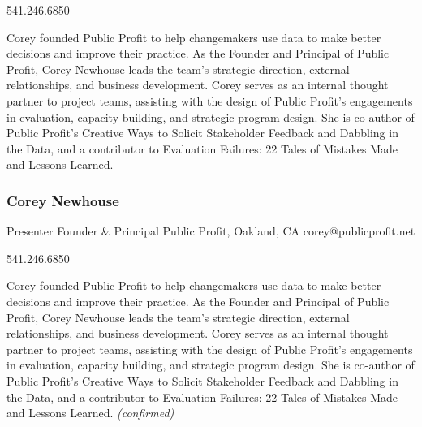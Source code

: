 \documentclass{report}
\begin{document}
              541.246.6850\newline

              Corey founded Public Profit to help changemakers use data to make better decisions and improve their practice. As the Founder and Principal of Public Profit, Corey Newhouse leads the team’s strategic direction, external relationships, and business development. Corey serves as an internal thought partner to project teams, assisting with the design of Public Profit’s engagements in evaluation, capacity building, and strategic program design. She is co-author of Public Profit’s Creative Ways to Solicit Stakeholder Feedback and Dabbling in the Data, and a contributor to Evaluation Failures: 22 Tales of Mistakes Made and Lessons Learned.\newline


              

              
                \subsubsection*{ Corey Newhouse }
                Presenter\newline
                Founder \& Principal\newline
                Public Profit, Oakland, CA
                \newline
                corey@publicprofit.net\newline
                
                541.246.6850\newline

                Corey founded Public Profit to help changemakers use data to make better decisions and improve their practice. As the Founder and Principal of Public Profit, Corey Newhouse leads the team’s strategic direction, external relationships, and business development. Corey serves as an internal thought partner to project teams, assisting with the design of Public Profit’s engagements in evaluation, capacity building, and strategic program design. She is co-author of Public Profit’s Creative Ways to Solicit Stakeholder Feedback and Dabbling in the Data, and a contributor to Evaluation Failures: 22 Tales of Mistakes Made and Lessons Learned.
                \emph{ (confirmed) }
              

              

              
\end{document}
